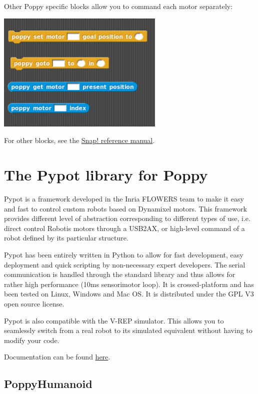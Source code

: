 \documentclass{article}
\begin{document}
 Other Poppy specific blocks allow you to command each motor separately:
 
  \begin{center}
  \includegraphics[width=0.6\textwidth]{img/snap_blocks}
 \end{center}

For other blocks, see the \href{http://snap.berkeley.edu/SnapManual.pdf}{Snap! reference manual}.


\section{The Pypot library for Poppy}
\label{pypot}

Pypot is a framework developed in the Inria FLOWERS team to make it easy and fast to control custom robots based on Dynamixel motors. This framework provides different level of abstraction corresponding to different types of use, i.e. direct control Robotis motors through a USB2AX, or high-level command of a robot defined by its particular structure.

Pypot has been entirely written in Python to allow for fast development, easy deployment and quick scripting by non-necessary expert developers. The serial communication is handled through the standard library and thus allows for rather high performance (10ms sensorimotor loop). It is crossed-platform and has been tested on Linux, Windows and Mac OS. It is distributed under the GPL V3 open source license.

Pypot is also compatible with the V-REP simulator. This allows you to seamlessly switch from a real robot to its simulated equivalent without having to modify your code.

Documentation can be found \href{http://poppy-project.github.io/pypot/index.html}{here}. %

\subsection{PoppyHumanoid}
\end{document}
